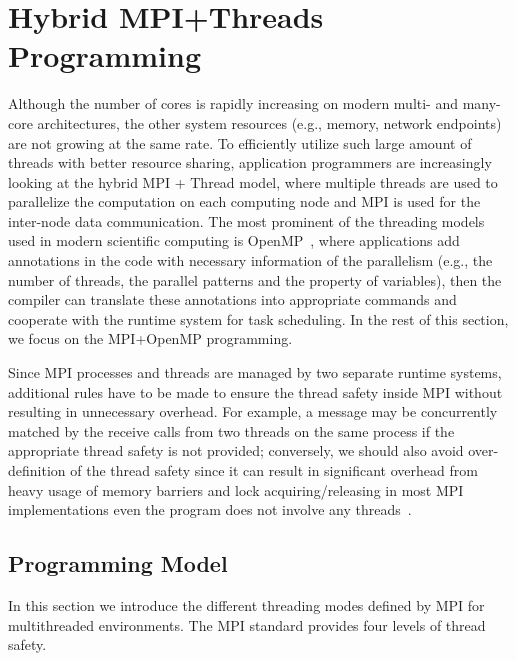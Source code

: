 \section{Hybrid MPI+Threads Programming}\label{sec:back-hybrid}

Although the number of cores is rapidly increasing on modern multi-
and many-core architectures, the other system resources (e.g., memory,
network endpoints) are not growing at the same rate. To efficiently utilize such
large amount of threads with better resource sharing, application programmers
are increasingly looking at the hybrid MPI + Thread model, where multiple threads
are used to parallelize the computation on each computing node and MPI
is used for the inter-node data communication. The most prominent of the
threading models used in modern scientific computing is OpenMP~\cite{openmp},
where applications add annotations in the code with necessary information of
the parallelism (e.g., the number of threads, the parallel patterns and
the property of variables), then the compiler can translate these annotations
into appropriate commands and cooperate with the runtime system for task
scheduling. In the rest of this section, we focus on the MPI+OpenMP programming.

Since MPI processes and threads are managed by two separate runtime systems,
additional rules have to be made to ensure the thread safety inside MPI without
resulting in unnecessary overhead. For example, a message may be concurrently
matched by the receive calls from two threads on the same process if the
appropriate thread safety is not provided; conversely, we should also avoid
over-definition of the thread safety since it can result in significant
overhead from heavy usage of memory barriers and lock acquiring\slash releasing
in most MPI implementations even the program does not involve any threads~\cite{thread-safety}.

\subsection{Programming Model}\label{sec:back-hybrid-model}

In this section we introduce the different threading modes defined by MPI for
multithreaded environments. The MPI standard provides four levels of thread
safety.

